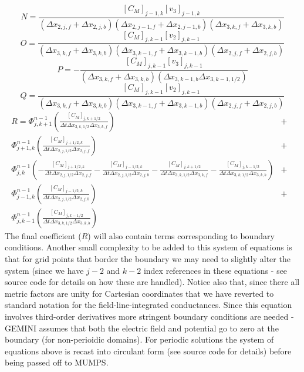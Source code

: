 \documentclass[11pt,letterpaper]{article}
\begin{document}
\begin{equation}
N = \frac{[C_M]_{j-1,k} [v_3]_{j-1,k} }{ \left( \Delta x_{2,j,f}+\Delta x_{2,j,b} \right) \left( \Delta x_{2,j-1,f}+\Delta x_{2,j-1,b} \right) \left( \Delta x_{3,k,f}+\Delta x_{3,k,b} \right) }
\end{equation}
\begin{equation}
O = \frac{[C_M]_{j,k-1} [v_2]_{j,k-1} }{ \left( \Delta x_{3,k,f}+\Delta x_{3,k,b} \right) \left( \Delta x_{3,k-1,f}+\Delta x_{3,k-1,b} \right) \left( \Delta x_{2,j,f}+\Delta x_{2,j,b} \right) }
\end{equation}
\begin{equation}
P = - \frac{[C_M]_{j,k-1} [v_{3}]_{j,k-1}}{\left( \Delta x_{3,k,f} + \Delta x_{3,k,b} \right) \left( \Delta x_{3,k-1,b} \Delta x_{3,k-1,1/2} \right)}
\end{equation}
\begin{equation}
Q = \frac{[C_M]_{j,k-1} [v_2]_{j,k-1} }{ \left( \Delta x_{3,k,f}+\Delta x_{3,k,b} \right) \left( \Delta x_{3,k-1,f}+\Delta x_{3,k-1,b} \right) \left( \Delta x_{2,j,f}+\Delta x_{2,j,b} \right) }
\end{equation}
\begin{eqnarray}
R = \Phi_{j,k+1}^{n-1} \left( \frac{[C_M]_{j,k+1/2}}{\Delta t \Delta x_{3,k,1/2} \Delta x_{3,k,f}} \right) &+& \nonumber \\
\Phi_{j+1,k}^{n-1} \left( \frac{[C_M]_{j+1/2,k}}{\Delta t \Delta x_{2,j,1/2} \Delta x_{2,j,f}} \right) &+& \nonumber \\
\Phi_{j,k}^{n-1} \left( -\frac{[C_M]_{j+1/2,k}}{\Delta t \Delta x_{2,j,1/2} \Delta x_{2,j,f}}  - \frac{[C_M]_{j-1/2,k}}{\Delta t \Delta x_{2,j,1/2} \Delta x_{2,j,b}} - \frac{[C_M]_{j,k+1/2}}{\Delta t \Delta x_{3,k,1/2} \Delta x_{3,k,f}} - \frac{[C_M]_{j,k-1/2}}{\Delta t \Delta x_{3,k,1/2} \Delta x_{3,k,b}} \right) &+& \nonumber \\
\Phi_{j-1,k}^{n-1} \left( \frac{[C_M]_{j-1/2,k}}{\Delta t \Delta x_{2,j,1/2} \Delta x_{2,j,b}} \right) &+& \nonumber \\
\Phi_{j,k-1}^{n-1} \left( \frac{[C_M]_{j,k-1/2}}{\Delta t \Delta x_{3,k,1/2} \Delta x_{3,k,b}} \right)
\end{eqnarray}
The final coefficient ($R$) will also contain terms corresponding to boundary conditions.  Another small complexity to be added to this system of equations is that for grid points that border the boundary we may need to slightly alter the system (since we have $j-2$ and $k-2$ index references in these equations - see source code for details on how these are handled).  Notice also that, since there all metric factors are unity for Cartesian coordinates that we have reverted to standard notation for the field-line-integrated conductances.  Since this equation involves third-order derivatives more stringent boundary conditions are needed - GEMINI assumes that both the electric field and potential go to zero at the boundary (for non-perioidic domains).  For periodic solutions the system of equations above is recast into circulant form (see source code for details) before being passed off to MUMPS.  
\end{document}
